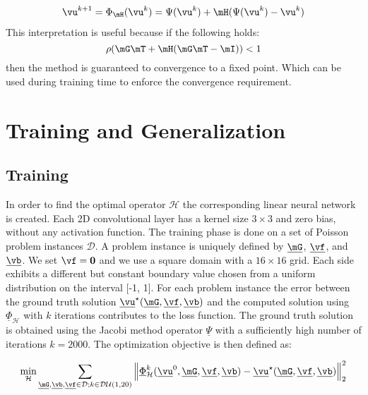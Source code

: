 \documentclass{article} %
\begin{document}
\begin{align*}
\vu^{k+1} &= \Phi_{\mH}(\vu^k) = \Psi(\vu^k) + \mH(\Psi(\vu^k)-\vu^k)\\
\label{jacobiMatrix}
\end{align*}
This interpretation is useful because if the following holds:
\begin{equation}
    \rho(\mG\mT+\mH(\mG\mT-\mI)) < 1
    \label{Eq:spectral}
\end{equation}
then the method is guaranteed to convergence to a fixed point. Which can be used during training time to enforce the convergence requirement.

\section{Training and Generalization}
\subsection{Training}
In order to find the optimal operator $\mathcal{H}$ the corresponding linear neural network is created. Each 2D convolutional layer has a kernel size $3\times 3$ and zero bias, without any activation function. The training phase is done on a set of Poisson problem instances $\mathcal{D}$. A problem instance is uniquely defined by $\underline{\mG}$, $\underline{\vf}$, and $\underline{\vb}$.
We set $\vf=\bold{0}$ and we use a square domain with a $16\times16$ grid. Each side exhibits a different but constant boundary value chosen from a uniform distribution on the interval [-1, 1]. For each problem instance the error between the ground truth solution $\underline{\vu} ^ {\star}(\underline{\mG}, \underline{\vf}, \underline{\vb})$ and the computed solution using $\underline{\Phi}_{\mathcal{H}}$ with $k$ iterations contributes to the loss function. The ground truth solution is obtained using the Jacobi method operator $\underline{\Psi}$ with a sufficiently high number of iterations $k=2000$.
The optimization objective is then defined as:



\begin{align}
    \underset{\mathcal{H}}{\text{min}} \sum_{\underline{\mG},\underline{\vb},\underline{\vf} \in \mathcal{D}; k \in \mathcal{DU}(1, 20)} \left \Vert \underline{\Phi}_{\mathcal{H}}^k (\underline{\vu}^0, \underline{\mG}, \underline{\vf}, \underline{\vb}) - \underline{\vu} ^ {\star}(\underline{\mG}, \underline{\vf}, \underline{\vb}) \right \Vert _2 ^ 2
\end{align}
\end{document}
